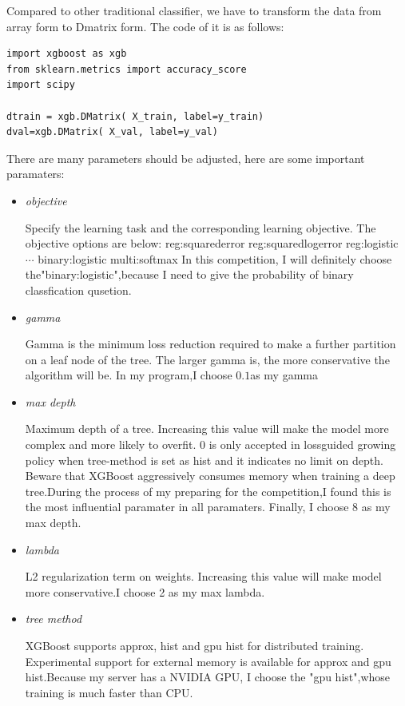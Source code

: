 \documentclass[sigconf]{acmart}
\begin{document}
Compared to other traditional classifier, we have to transform the data from array form to Dmatrix form. The code of it is as follows:
\begin{lstlisting}
import xgboost as xgb
from sklearn.metrics import accuracy_score
import scipy

dtrain = xgb.DMatrix( X_train, label=y_train)
dval=xgb.DMatrix( X_val, label=y_val)
\end{lstlisting}

There are many parameters should be adjusted, here are some important paramaters:

\begin{itemize}
\item \textit{objective}

Specify the learning task and the corresponding learning objective. The objective options are below:
	\subitem reg:squarederror
	\subitem reg:squaredlogerror
	\subitem reg:logistic
	\subitem $\cdots$
	\subitem binary:logistic
	\subitem multi:softmax
In this competition, I will definitely choose the"binary:logistic",because I need to give the probability of binary classfication qusetion.

\item \textit{gamma}

Gamma is the minimum loss reduction required to make a further partition on a leaf node of the tree. The larger gamma is, the more conservative the algorithm will be. In my program,I choose $0.1$as my gamma

\item \textit{max depth}

Maximum depth of a tree. Increasing this value will make the model more complex and more likely to overfit. 0 is only accepted in lossguided growing policy when tree-method is set as hist and it indicates no limit on depth. Beware that XGBoost aggressively consumes memory when training a deep tree.During the process of my preparing for the competition,I found this is the most influential paramater in all paramaters. Finally, I choose 8 as my max depth.

\item \textit{lambda}

L2 regularization term on weights. Increasing this value will make model more conservative.I choose 2 as my max lambda.

\item \textit{tree method}

XGBoost supports approx, hist and gpu hist for distributed training. Experimental support for external memory is available for approx and gpu hist.Because my server has a NVIDIA GPU, I choose the "gpu hist",whose training is much faster than CPU.

\end{itemize}
\end{document}
